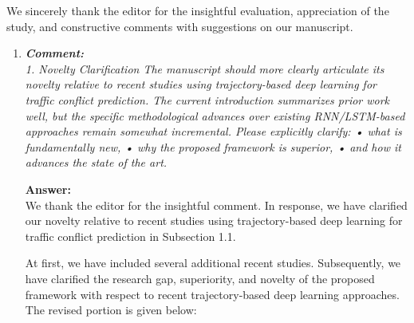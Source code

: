 \documentclass[12pt]{article}
\begin{document}
\begin{center}
\end{center}
We sincerely thank the editor for the insightful evaluation, appreciation of the study, and constructive comments with suggestions on our manuscript. 
\begin{enumerate}	
\item \textit{\textbf{Comment:\\}	
1. Novelty Clarification The manuscript should more clearly articulate its novelty relative to recent studies using trajectory-based deep learning for traffic conflict prediction. The current introduction summarizes prior work well, but the specific methodological advances over existing RNN/LSTM-based approaches remain somewhat incremental. Please explicitly clarify: • what is fundamentally new, • why the proposed framework is superior, • and how it advances the state of the art.}

\textbf{Answer:\\} We thank the editor for the insightful comment. In response, we have clarified our novelty relative to recent studies using trajectory-based deep learning for traffic conflict prediction in Subsection 1.1. 

At first, we have included several additional recent studies. Subsequently, we have clarified the research gap, superiority, and novelty of the proposed framework with respect to recent trajectory-based deep learning approaches. The revised portion is given below:


\end{enumerate}
\end{document}
